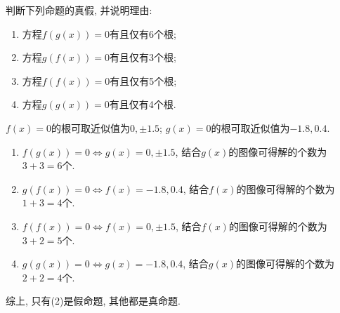 \begin{enumerate}
判断下列命题的真假, 并说明理由: 
\begin{enumerate}
\item 方程$f(g(x))=0$有且仅有6个根; 
\item 方程$g(f(x))=0$有且仅有3个根; 
\item 方程$f(f(x))=0$有且仅有5个根; 
\item 方程$g(g(x))=0$有且仅有4个根. 
\end{enumerate}
\begin{jieda}
$f(x)=0$的根可取近似值为$0,\pm1.5$; $g(x)=0$的根可取近似值为$-1.8,0.4$. 
\begin{enumerate}
\item $f(g(x))=0\iff g(x)=0,\pm1.5$, 结合$g(x)$的图像可得解的个数为$3+3=6$个. 
\item $g(f(x))=0\iff f(x)=-1.8,0.4$, 结合$f(x)$的图像可得解的个数为$1+3=4$个. 
\item $f(f(x))=0\iff f(x)=0,\pm1.5$, 结合$f(x)$的图像可得解的个数为$3+2=5$个. 
\item $g(g(x))=0\iff g(x)=-1.8,0.4$, 结合$g(x)$的图像可得解的个数为$2+2=4$个. 
\end{enumerate}
综上, 只有(2)是假命题, 其他都是真命题. 
\end{jieda}

\end{enumerate}

